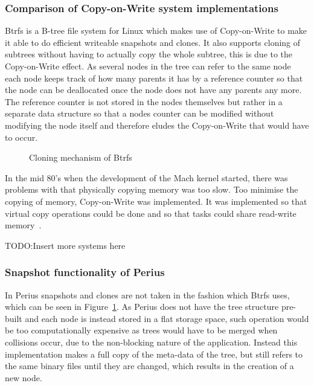 \documentclass[a4paper,12pt]{article}
\newcounter{subsubsubsection}[subsubsection]
\newcommand{\fix}{\colorbox{yellow!30}{TODO:}}
\begin{document}
\subsubsection{Comparison of Copy-on-Write system implementations}
Btrfs is a B-tree file system for Linux which makes use of Copy-on-Write to make it able to do
efficient writeable snapshots and clones. It also supports cloning of subtrees without having to
actually copy the whole subtree, this is due to the Copy-on-Write effect. As several nodes in the
tree can refer to the same node each node keeps track of how many parents it has by a reference
counter so that the node can be deallocated once the node does not have any parents any more. The
reference counter is not stored in the nodes themselves but rather in a separate data structure so
that a nodes counter can be modified without modifying the node itself and therefore eludes the
Copy-on-Write that would have to occur.

\begin{figure}[htp] 
    \caption{Cloning mechanism of Btrfs~\cite{BTRFS}}
    \label{fig:btrfs_tree}
\end{figure}

In the mid 80's when the development of the Mach kernel started, there was problems with that
physically copying memory was too slow. Too minimise the copying of memory, Copy-on-Write was
implemented. It was implemented so that virtual copy operations could be done and so that tasks
could share read-write memory~\cite{MACH}.


\fix Insert more systems here

\subsubsection{Snapshot functionality of Perius}
In Perius snapshots and clones are not taken in the fashion which Btrfs uses, which can be seen in
Figure~\ref{fig:btrfs_tree}. As Perius does not have the tree structure pre-built and each node is
instead stored in a flat storage space, such operation would be too computationally expensive as
trees would have to be merged when collisions occur, due to the non-blocking nature of the
application. Instead this implementation makes a full copy of the meta-data of the tree, but still
refers to the same binary files until they are changed, which results in the creation of a new node.
\end{document}
